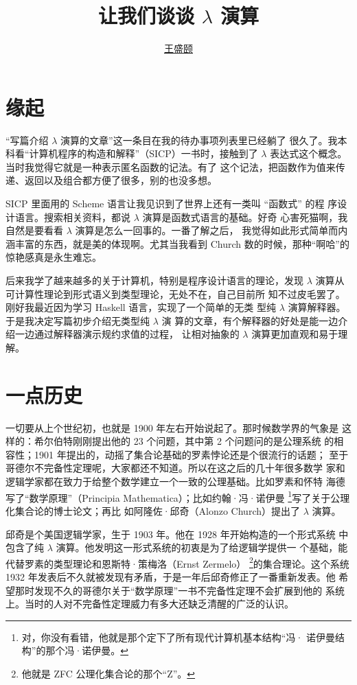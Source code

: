 \documentclass[a4paper,adobefonts]{ctexart}
\begin{document}
\title{{\bfseries 让我们谈谈 $\lambda$ 演算}}
\author{\href{mailto:txyyss@gmail.com}{王盛颐}}
\date{}
\maketitle

\section*{缘起}

``写篇介绍 $\lambda$ 演算的文章''这一条目在我的待办事项列表里已经躺了
很久了。我本科看``计算机程序的构造和解释''（SICP）一书时，接触到了
$\lambda$ 表达式这个概念。当时我觉得它就是一种表示匿名函数的记法。有了
这个记法，把函数作为值来传递、返回以及组合都方便了很多，别的也没多想。

SICP 里面用的 Scheme 语言让我见识到了世界上还有一类叫 ``函数式'' 的程
序设计语言。搜索相关资料，都说 $\lambda$ 演算是函数式语言的基础。好奇
心害死猫啊，我自然是要看看 $\lambda$ 演算是怎么一回事的。一番了解之后，
我觉得如此形式简单而内涵丰富的东西，就是美的体现啊。尤其当我看到
Church 数的时候，那种``啊哈''的惊艳感真是永生难忘。

后来我学了越来越多的关于计算机，特别是程序设计语言的理论，发现
$\lambda$ 演算从可计算性理论到形式语义到类型理论，无处不在，自己目前所
知不过皮毛罢了。刚好我最近因为学习 Haskell 语言，实现了一个简单的无类
型纯 $\lambda$ 演算解释器。于是我决定写篇初步介绍无类型纯 $\lambda$ 演
算的文章，有个解释器的好处是能一边介绍一边通过解释器演示规约求值的过程，
让相对抽象的 $\lambda$ 演算更加直观和易于理解。

\section{一点历史}

一切要从上个世纪初，也就是 1900 年左右开始说起了。那时候数学界的气象是
这样的：希尔伯特刚刚提出他的 23 个问题，其中第 2 个问题问的是公理系统
的相容性；1901 年提出的，动摇了集合论基础的罗素悖论还是个很流行的话题；
至于哥德尔不完备性定理呢，大家都还不知道。所以在这之后的几十年很多数学
家和逻辑学家都在致力于给整个数学建立一个一致的公理基础。比如罗素和怀特
海德写了``数学原理''（Principia Mathematica）；比如约翰·冯·诺伊曼
\footnote{对，你没有看错，他就是那个定下了所有现代计算机基本结构``冯·
  诺伊曼结构''的那个冯·诺伊曼。}写了关于公理化集合论的博士论文；再比
如阿隆佐·邱奇（Alonzo Church）提出了 $\lambda$ 演算。

邱奇是个美国逻辑学家，生于 1903 年。他在 1928 年开始构造的一个形式系统
中包含了纯 $\lambda$ 演算。他发明这一形式系统的初衷是为了给逻辑学提供一
个基础，能代替罗素的类型理论和恩斯特·策梅洛（Ernst Zermelo）
\footnote{他就是 ZFC 公理化集合论的那个``Z''。}的集合理论。这个系统
1932 年发表后不久就被发现有矛盾，于是一年后邱奇修正了一番重新发表。他
希望那时发现不久的哥德尔关于``数学原理''一书不完备性定理不会扩展到他的
系统上。当时的人对不完备性定理威力有多大还缺乏清醒的广泛的认识。
\end{document}
